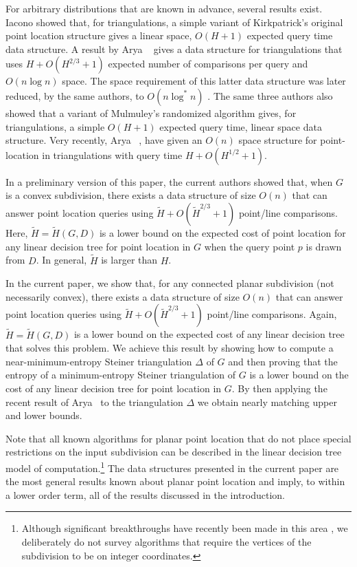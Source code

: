 \documentclass[lotsofwhite]{patmorin}
\begin{document}
For arbitrary distributions that are known in advance, several results
exist.  Iacono \cite{i01,i04} showed that, for triangulations, a
simple variant of Kirkpatrick's original point location structure
gives a linear space, $O(H+1)$ expected query time data structure.  A
result by Arya \etal\ \cite{amm00} gives a data structure for
triangulations that uses $H + O(H^{2/3}+1)$ expected number of
comparisons per query and $O(n\log n)$ space.  The space requirement
of this latter data structure was later reduced, by the same authors,
to $O(n\log^* n)$ \cite{amm01a}.  The same three authors
\cite{amm01b} also showed that a variant of Mulmuley's randomized algorithm
gives, for triangulations, a simple $O(H+1)$ expected query time,
linear space data structure.  Very recently, Arya \etal\
\cite{ammw07}, have given an $O(n)$ space structure for point-location
in triangulations with query time $H+O(H^{1/2}+1)$. 

In a preliminary version of this paper, the current authors
\cite{soda07} showed that, when $G$ is a convex subdivision, there
exists a data structure of size $O(n)$ that can answer point location
queries using $\tilde H + O(\tilde H^{2/3}+1)$ point/line comparisons.
Here, $\tilde H=\tilde H(G,D)$ is a lower bound on the expected cost
of point location for any linear decision tree for point location in
$G$ when the query point $p$ is drawn from $D$.  In general, $\tilde
H$ is larger than $H$.

In the current paper, we show that, for any connected planar
subdivision (not necessarily convex), there exists a data structure of
size $O(n)$ that can answer point location queries using $\tilde H +
O(\tilde H^{2/3}+1)$ point/line comparisons.  Again, $\tilde H=\tilde
H(G,D)$ is a lower bound on the expected cost of any linear decision
tree that solves this problem.  We achieve this result by showing how
to compute a near-minimum-entropy Steiner triangulation $\Delta$ of
$G$ and then proving that the entropy of a minimum-entropy Steiner
triangulation of $G$ is a lower bound on the cost of any linear
decision tree for point location in $G$.  By then applying the recent
result of Arya \etal\ to the triangulation $\Delta$ we obtain nearly
matching upper and lower bounds.

Note that all known algorithms for planar point location that do not
place special restrictions on the input subdivision can be described
in the linear decision tree model of computation.\footnote{Although
significant breakthroughs have recently been made in this area
\cite{c06,p06}, we deliberately do not survey algorithms that require
the vertices of the subdivision to be on integer coordinates.}  The
data structures presented in the current paper are the most general
results known about planar point location and imply, to within a
lower order term, all of the results discussed in the introduction.
\end{document}
